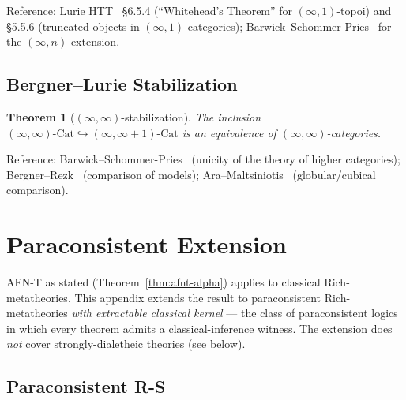 \documentclass[11pt]{article}
\theoremstyle{plain}
\newtheorem{theorem}{Theorem}[section]
\theoremstyle{definition}
\newcommand{\Cat}{\mathrm{Cat}}
\begin{document}
Reference: Lurie HTT~\cite{LurieHTT} \S 6.5.4 (``Whitehead's Theorem'' for $(\infty, 1)$-topoi) and \S 5.5.6 (truncated objects in $(\infty, 1)$-categories); Barwick--Schommer-Pries~\cite{BarwickSchommerPries2021} for the $(\infty, n)$-extension.

\subsection{Bergner--Lurie Stabilization}

\begin{theorem}[$(\infty, \infty)$-stabilization]\label{thm:bergner-lurie-stab}
The inclusion $(\infty, \infty)\text{-}\Cat \hookrightarrow (\infty, \infty + 1)\text{-}\Cat$ is an equivalence of $(\infty, \infty)$-categories.
\end{theorem}

Reference: Barwick--Schommer-Pries~\cite{BarwickSchommerPries2021} (unicity of the theory of higher categories); Bergner--Rezk~\cite{BergnerRezk2013} (comparison of models); Ara--Maltsiniotis~\cite{AraMaltsiniotis2017} (globular/cubical comparison).

\section{Paraconsistent Extension}\label{app:paraconsistent}

AFN-T as stated (Theorem~\ref{thm:afnt-alpha}) applies to classical Rich-metatheories. This appendix extends the result to paraconsistent Rich-metatheories \emph{with extractable classical kernel} --- the class of paraconsistent logics in which every theorem admits a classical-inference witness. The extension does \emph{not} cover strongly-dialetheic theories (see below).

\subsection{Paraconsistent R-S}
\end{document}
